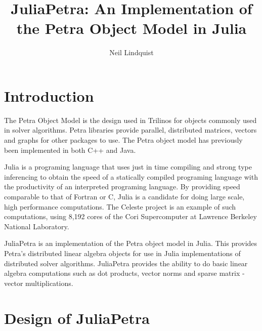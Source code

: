 \documentclass[acmsmall]{acmart}
\title{JuliaPetra: An Implementation of the Petra Object Model in Julia}
\author{Neil Lindquist}
\begin{document}
\maketitle


\section{Introduction}


The Petra Object Model is the design used in Trilinos for objects commonly used in solver algorithms.
\cite{OverviewOfTrilinos}
Petra libraries provide parallel, distributed matrices, vectors and graphs for other packages to use.
The Petra object model has previously been implemented in both C++ and Java.

Julia is a programing language that uses just in time compiling and strong type inferencing
to obtain the speed of a statically compiled programing language with the productivity of an
interpreted programing language. \cite{JuliaFreshApproach}
By providing speed comparable to that of Fortran or C, Julia is a candidate for doing large scale,
high performance computations.
The Celeste project is an example of such computations, using 8,192 cores of the Cori Supercomputer
at Lawrence Berkeley National Laboratory.

JuliaPetra is an implementation of the Petra object model in Julia.
This provides Petra's distributed linear algebra objects for use in Julia implementations
of distributed solver algorithms.
JuliaPetra provides the ability to do basic linear algebra computations
such as dot products, vector norms and sparse matrix - vector multiplications.

\section{Design of JuliaPetra}
\end{document}

